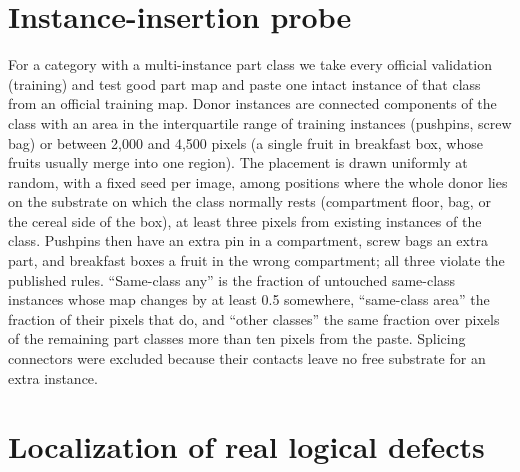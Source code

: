 \section{Instance-insertion probe}
\label{sec:supp_insertion}
For a category with a multi-instance part class we take every official validation (training) and test good part map and paste one intact instance of that class from an official training map. Donor instances are connected components of the class with an area in the interquartile range of training instances (pushpins, screw bag) or between 2{,}000 and 4{,}500 pixels (a single fruit in breakfast box, whose fruits usually merge into one region). The placement is drawn uniformly at random, with a fixed seed per image, among positions where the whole donor lies on the substrate on which the class normally rests (compartment floor, bag, or the cereal side of the box), at least three pixels from existing instances of the class. Pushpins then have an extra pin in a compartment, screw bags an extra part, and breakfast boxes a fruit in the wrong compartment; all three violate the published rules. ``Same-class any'' is the fraction of untouched same-class instances whose map changes by at least 0.5 somewhere, ``same-class area'' the fraction of their pixels that do, and ``other classes'' the same fraction over pixels of the remaining part classes more than ten pixels from the paste. Splicing connectors were excluded because their contacts leave no free substrate for an extra instance.
\begin{table}[t]
\centering
\caption{Instance-insertion probe on part maps (composition branch). Instance AUROC ranks the pasted instance against the untouched instances of its class.}
\label{tab:insertion}
\footnotesize\setlength{\tabcolsep}{4pt}

\end{table}
\section{Localization of real logical defects}
\label{sec:supp_native}
\begin{table}[t]
\centering
\caption{Localization of real logical defects by category (AU-sPRO up to 5\% FPR, \%). Class-wide and footprint heads continue the released head for 1.6k steps on identical inputs; the last two columns are paired differences with 95\% bootstrap intervals. Bold: best head in each row.}
\label{tab:native_main}
\small\setlength{\tabcolsep}{4.6pt}

\end{table}

